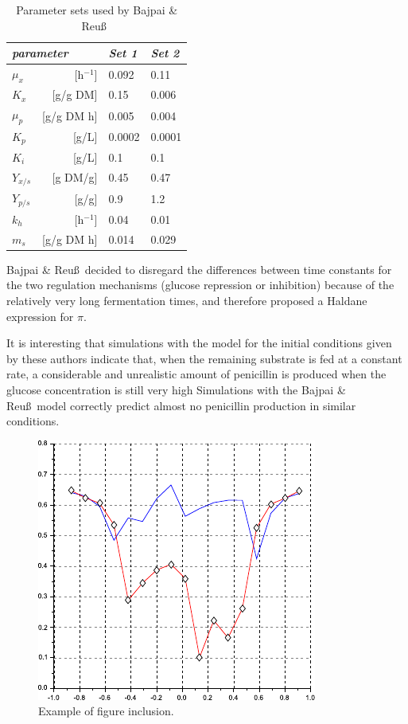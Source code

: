 \documentclass[ejs]{imsart}
\numberwithin{equation}{section}
\theoremstyle{plain}
\theoremstyle{definition}
\theoremstyle{remark}
\begin{document}
\begin{table}
\centering
\caption{Parameter sets used by Bajpai \& Reu\ss\ }\label{parset}
\begin{tabular}{lrll}
\hline
\multicolumn{2}{l}{\it parameter} & {\it Set 1} & {\it Set 2}\\
\hline
$\mu_{x}$           & [h$^{-1}$]  & 0.092       & 0.11          \\
$K_{x}$             & [g/g DM]     & 0.15        & 0.006         \\
$\mu_{p}$           & [g/g DM h]  & 0.005       & 0.004         \\
$K_{p}$             & [g/L]        & 0.0002      & 0.0001        \\
$K_{i}$             & [g/L]        & 0.1         & 0.1           \\
$Y_{x/s}$           & [g DM/g]     & 0.45        & 0.47          \\
$Y_{p/s}$           & [g/g]        & 0.9         & 1.2           \\
$k_{h}$             & [h$^{-1}$]  & 0.04        & 0.01          \\
$m_{s}$             & [g/g DM h]  & 0.014       & 0.029         \\
\hline
\end{tabular}
\end{table}

Bajpai \& Reu\ss\ decided to disregard the
differences between time constants for the two regulation mechanisms
(glucose repression or inhibition) because of the
relatively very long fermentation times, and therefore proposed a Haldane
expression for $\pi$.

It is interesting that simulations with the \cite{r4} model for the
initial conditions given by these authors indicate that, when the
remaining substrate is fed at a constant rate, a considerable and
unrealistic amount of penicillin is
produced when the glucose concentration is still very high \cite{r2,r3,r4}
Simulations with the Bajpai \& Reu\ss\ model correctly predict almost
no penicillin production in similar conditions.

\begin{figure}
\includegraphics{figure1}
\caption{Example of figure inclusion.}
\label{penG}
\end{figure}
\end{document}
